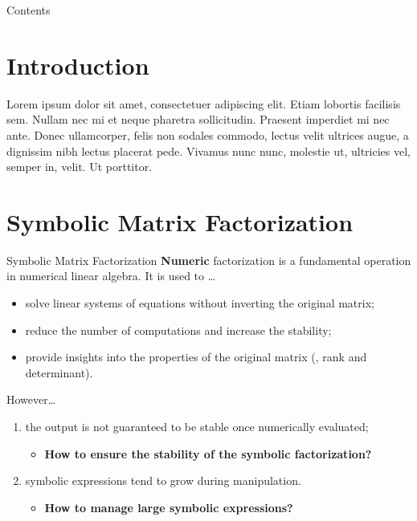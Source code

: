 
\begin{frame}{Contents}
  \tableofcontents
\end{frame}

\section{Introduction}
\begin{frame}[plain]
  \begin{quag}[Introduction]
    Lorem ipsum dolor sit amet, consectetuer adipiscing elit.
    Etiam lobortis facilisis sem. Nullam nec mi et neque
    pharetra sollicitudin. Praesent imperdiet mi nec ante. Donec
    ullamcorper, felis non sodales commodo, lectus velit ultrices
    augue, a dignissim nibh lectus placerat pede. Vivamus nunc
    nunc, molestie ut, ultricies vel, semper in, velit. Ut porttitor.
  \end{quag}
\end{frame}


\section{Symbolic Matrix Factorization}

\begin{frame}
  \tableofcontents[currentsection]
\end{frame}

\begin{frame}{Symbolic Matrix Factorization}
  \textbf{Numeric} factorization is a fundamental operation in numerical linear algebra. It is used to \dots
  \begin{itemize}
    \item solve linear systems of equations without inverting the original matrix;
    \item reduce the number of computations and increase the stability;
    \item provide insights into the properties of the original matrix (\ie{}, rank and determinant).
  \end{itemize}
  \vspace{1.0em}
  \vspace{1.0em}
  However\dots
  \begin{enumerate}
    \item the output is not guaranteed to be stable once numerically evaluated;
    \begin{itemize}
      \item[] \textbf{How to ensure the stability of the symbolic factorization?}
    \end{itemize}
    \item symbolic expressions tend to grow during manipulation.
    \begin{itemize}
      \item[] \textbf{How to manage large symbolic expressions?}
    \end{itemize}
  \end{enumerate}
\end{frame}

